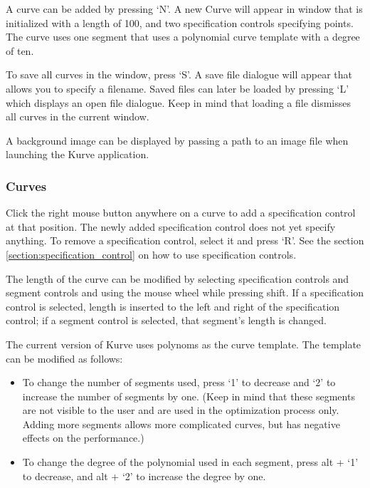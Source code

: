 \documentclass[a4paper]{article}
\begin{document}
					A curve can be added by pressing `N'. A new Curve will appear in window that is initialized with a length of 100, and two specification controls specifying points. The curve uses one segment that uses a polynomial curve template with a degree of ten.
					
					To save all curves in the window, press `S'. A save file dialogue will appear that allows you to specify a filename. Saved files can later be loaded by pressing `L' which displays an open file dialogue. Keep in mind that loading a file dismisses all curves in the current window.
					
					A background image can be displayed by passing a path to an image file when launching the Kurve application.
					
				\subsubsection{Curves}
					
					Click the right mouse button anywhere on a curve to add a specification control at that position. The newly added specification control does not yet specify anything. To remove a specification control, select it and press `R'. See the section \ref{section:specification_control} on how to use specification controls. 
					
					The length of the curve can be modified by selecting specification controls and segment controls and using the mouse wheel while pressing shift. If a specification control is selected, length is inserted to the left and right of the specification control; if a segment control is selected, that segment's length is changed.
					
					The current version of Kurve uses polynoms as the curve template. The template can be modified as follows:
					
					\begin{itemize}
						\item To change the number of segments used, press `1' to decrease and `2' to increase the number of segments by one. (Keep in mind that these segments are not visible to the user and are used in the optimization process only. Adding more segments allows more complicated curves, but has negative effects on the performance.)
						\item To change the degree of the polynomial used in each segment, press alt + `1' to decrease, and alt + `2' to increase the degree by one.
					\end{itemize}
				
\end{document}
